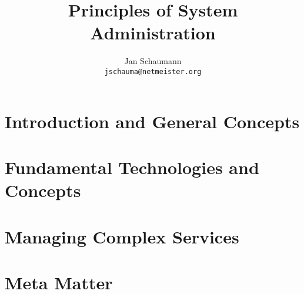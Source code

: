 

\makeindex
{}



\title{Principles of System Administration}
\author{Jan Schaumann \\
\texttt{jschauma@netmeister.org}}

\maketitle

\tableofcontents
\lstlistoflistings
{}
\listoffigures



\frontmatter



\mainmatter
\part[Introduction and General Concepts]
{Introduction and General Concepts}
\label{part:introduction}





\part[Fundamental Technologies and Concepts]
{Fundamental Technologies and Concepts}
\label{part:fundamentals}












\part[Managing Complex Services]
{Managing Complex Services}
\label{part:services}







\part[Meta Matter]
{Meta Matter}
\label{part:meta}







\printglossaries
{}



\clearpage
{}
\printindex

\clearpage
{}
\printindex[names]



